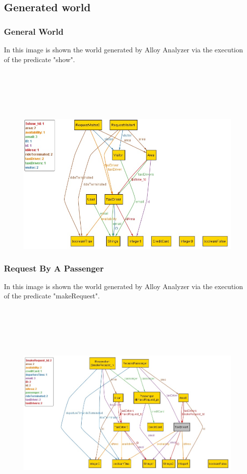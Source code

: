 \documentclass[18pt,oneside,a4paper, titlepage]{article}
\begin{document}
	\subsection{Generated world}
		\subsubsection{General World}
		In this image is shown the world generated by Alloy Analyzer via the
		execution of the predicate "show".
		\\ \\ \\ \\ \\ \\
			\begin{figure}[h]
				\includegraphics[scale=0.7]{Alloy/show.jpg}
			\end{figure}
\newpage
		\subsubsection{Request By A Passenger}
		In this image is shown the world generated by Alloy Analyzer via the
		execution of the predicate "makeRequest".
		\\ \\ \\ \\ \\ \\
		\begin{figure}[h]
			\includegraphics[scale=0.6]{Alloy/makeRequest.jpg}
		\end{figure}
\newpage
\end{document}
